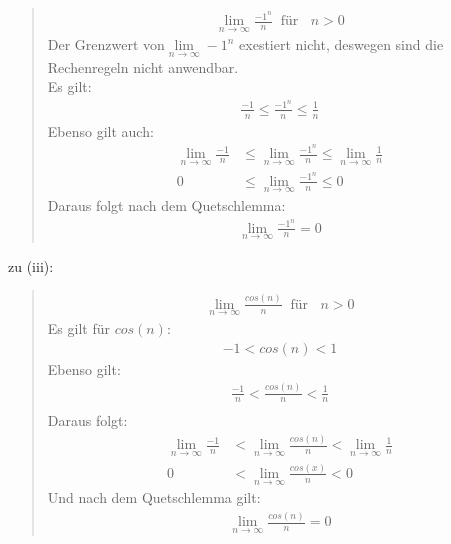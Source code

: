 \begin{quote}
	\begin{align*}
	\lim\limits_ {n\to\infty}\frac{-1^n}{n}\;\;\text{für }\;\;n>0
	\end{align*}
	Der Grenzwert von$\lim\limits_ {n\to\infty}-1^n  $ exestiert nicht, deswegen sind die Rechenregeln nicht anwendbar.\\
	Es gilt:\\
	\begin{align*}
	\frac{-1}{n}\leq\frac{-1^n}{n}\leq \frac{1}{n}
	\end{align*}
	Ebenso gilt auch:\\
	\begin{align*}
	\lim\limits_ {n\to\infty}\frac{-1}{n}&\leq \lim\limits_ {n\to\infty}\frac{-1^n}{n}\leq \lim\limits_ {n\to\infty}\frac{1}{n}\\
	0&\leq\lim\limits_ {n\to\infty}\frac{-1^n}{n}\leq 0
	\end{align*}
	Daraus folgt nach dem Quetschlemma:\\
	\begin{align*}
	\lim\limits_ {n\to\infty}\frac{-1^n}{n}=0
	\end{align*}
\end{quote}
zu (iii):\\
\begin{quote}
	\begin{align*}
	\lim\limits_ {n\to\infty}\frac{cos(n)}{n}\;\;\text{für }\;\; n>0 
	\end{align*}
	Es gilt für $ cos(n) $:\\
	\begin{align*}
	-1<cos(n)<1
	\end{align*}
	Ebenso gilt:\\
	\begin{align*}
	\frac{-1}{n}<\frac{cos(n)}{n}<\frac{1}{n}\\
	\end{align*}
	Daraus folgt:\\
	\begin{align*}
	\lim\limits_ {n\to\infty} \frac{-1}{n}&<\lim\limits_ {n\to\infty}\frac{cos(n)}{n}<\lim\limits_ {n\to\infty}\frac{1}{n}\\
	0&<\lim\limits_ {n\to\infty}\frac{cos(x)}{n}<0
	\end{align*}
	Und nach dem Quetschlemma gilt:\\
	\begin{align*}
	\lim\limits_ {n\to\infty}\frac{cos(n)}{n}=0
	\end{align*}	
\end{quote}
